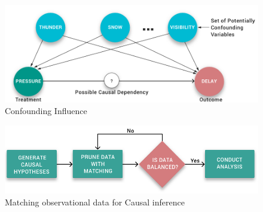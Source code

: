  

\begin{figure}
\hspace*{.3cm}\includegraphics[scale=0.2]{figures/Scenario-Graph.png}
\caption{Confounding Influence}

\label{fig:cv}
\vspace{-0.3cm}
\end{figure}
\begin{figure}
  \includegraphics[scale=0.2]{Figures/Matching-Flowchart.png}
\caption{Matching observational data for Causal inference}
\label{fig:flowchart}
\vspace{-0.3cm}
\end{figure}








